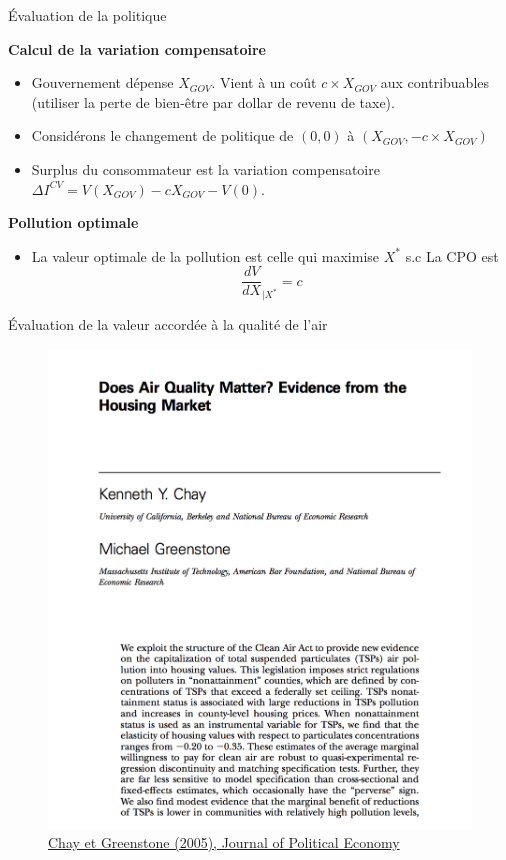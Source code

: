 \documentclass[handout]{beamer}
\newenvironment{iPar}[1]{\textbf{#1} \begin{itemize}}{\end{itemize}}
\newcommand{\mdp}{\medskip \pause}
\begin{document}
\begin{frame}{Évaluation de la politique}

\begin{iPar}{Calcul de la variation compensatoire}
\item Gouvernement dépense $X_{GOV}$. Vient à un coût $c\times X_{GOV}$ aux contribuables (utiliser la perte de bien-être par dollar de revenu de taxe).
\item Considérons le changement de politique de   $(0,0)$ à  $(X_{GOV}, - c \times X_{GOV})$
\item Surplus du consommateur est la variation compensatoire $\Delta I^{CV} =  V(X_{GOV}) - c X_{GOV} - V(0)$.
\end{iPar}\mdp

\begin{iPar}{Pollution optimale}
\item La valeur optimale de la pollution est celle qui maximise $X^*$ s.c \mdp
La CPO est
$$\frac{dV}{d X}_{|X^*} = c$$
\end{iPar}

\end{frame}



\begin{frame}{Évaluation de la valeur accordée à la qualité de l'air}
\begin{figure}
\includegraphics[scale=0.3]{chay.png}
\caption{\href{https://www.jstor.org/stable/10.1086/427462}{Chay et Greenstone (2005), Journal of Political Economy}}
\end{figure}
\end{frame}
\end{document}
